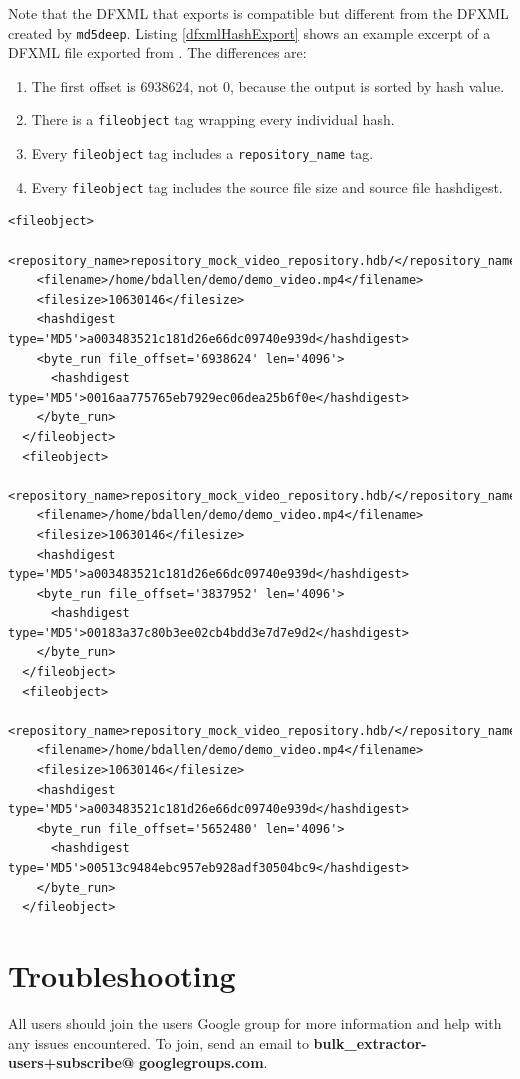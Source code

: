 \documentclass[11pt,fleqn]{article} %
\begin{document}
Note that the DFXML that \hash exports is compatible but different from the DFXML created by \texttt{md5deep}. Listing \ref{dfxmlHashExport} shows an example excerpt of a DFXML file exported from \hash. The differences are:
\begin{enumerate}
\item The first offset is 6938624, not 0,
because the output is sorted by hash value. 
\item There is a \texttt{fileobject} tag wrapping every individual hash.
\item Every \texttt{fileobject} tag includes a \texttt{repository\_name} tag.
\item Every \texttt{fileobject} tag includes the source file size and source file hashdigest.
\end{enumerate}

\lstset{style=customfile}
\begin{lstlisting}[float, caption=Excerpt of a DFXML exported by \hash, label=dfxmlHashExport]
  <fileobject>
    <repository_name>repository_mock_video_repository.hdb/</repository_name>
    <filename>/home/bdallen/demo/demo_video.mp4</filename>
    <filesize>10630146</filesize>
    <hashdigest type='MD5'>a003483521c181d26e66dc09740e939d</hashdigest>
    <byte_run file_offset='6938624' len='4096'>
      <hashdigest type='MD5'>0016aa775765eb7929ec06dea25b6f0e</hashdigest>
    </byte_run>
  </fileobject>
  <fileobject>
    <repository_name>repository_mock_video_repository.hdb/</repository_name>
    <filename>/home/bdallen/demo/demo_video.mp4</filename>
    <filesize>10630146</filesize>
    <hashdigest type='MD5'>a003483521c181d26e66dc09740e939d</hashdigest>
    <byte_run file_offset='3837952' len='4096'>
      <hashdigest type='MD5'>00183a37c80b3ee02cb4bdd3e7d7e9d2</hashdigest>
    </byte_run>
  </fileobject>
  <fileobject>
    <repository_name>repository_mock_video_repository.hdb/</repository_name>
    <filename>/home/bdallen/demo/demo_video.mp4</filename>
    <filesize>10630146</filesize>
    <hashdigest type='MD5'>a003483521c181d26e66dc09740e939d</hashdigest>
    <byte_run file_offset='5652480' len='4096'>
      <hashdigest type='MD5'>00513c9484ebc957eb928adf30504bc9</hashdigest>
    </byte_run>
  </fileobject>
\end{lstlisting}




\section{Troubleshooting}
\label{DebuggingHashdb}
All \hash users should join the \bulk users Google group for more information and help with any issues encountered. To join, send an email to \textbf{bulk\_extractor-users+subscribe@} \textbf{googlegroups.com}.  \\
\end{document}

